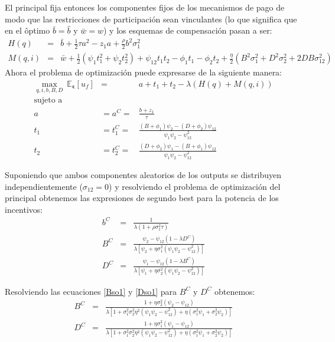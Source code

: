 ﻿\documentclass[12pt,letterpaper]{article}
\begin{document}
El principal fija entonces los componentes fijos de los mecanismos de pago de modo que las restricciones de participaci\'on sean vinculantes (lo que significa que en el \^optimo $ \bar{b}=\widehat{b} $ y $\bar{w}=\widehat{w} $) y los esquemas de compensaci\'on pasan a ser:
\begin{eqnarray*}
 H(q) &=& \bar{b}+\frac{1}{2}\tau a^2-z_1a+\frac{\rho}{2}b^2\sigma_1^2\\
  M(q,i) &=& \bar{w}+\frac{1}{2}(\psi_1t_1^2+\psi_2t_2^2)+\psi_{12}t_1t_2-\phi_1t_1-\phi_2t_2+\frac{\eta}{2}(B^2\sigma_1^2+D^2\sigma_2^2+2DB\sigma_{12}^2)
\end{eqnarray*}
Ahora el problema de optimizaci\'on puede expresarse de la siguiente manera:
\begin{eqnarray*}
\max\limits_{q,i,b,B,D}\ \mathbb{E}_{\mathbold{\epsilon}}[u_f]&=&a+t_1+t_2-\lambda(H(q)+M(q,i))\\
\nonumber \text{sujeto a }&&\\
a&=a^{C}=&\frac{b+z_1}{\tau}\\
t_1&=t_1^{C}=&\frac{(B+\phi_1)\psi_2-(D+\phi_2)\psi_{12}}{\psi_1\psi_2-\psi_{12}^2}\\
t_2&=t_2^{C}=&\frac { \left( D+\phi_{{2}} \right) \psi_{{1}}- \left( B+\phi _{{1}} \right)\psi_{{12}}}{\psi_1\psi_2-\psi_{12}^2}
\end{eqnarray*}

Suponiendo que ambos componentes aleatorios de los outputs se distribuyen independientemente ($\sigma_{12}=0$) y resolviendo el problema de optimizaci\'on del principal obtenemos las expresiones de segundo best para la potencia de los incentivos:
\begin{eqnarray}
b^C&=&\frac {1}{\lambda(1+\rho\sigma_1^2\tau)}\label{bso}\\
B^C&=&\frac{\psi_2-\psi_{12}(1-\lambda D^C)}{\lambda[\psi_2+\eta\sigma_1^2(\psi_1\psi_2-\psi_{12}^2)]}\label{Bso1}\\
D^C&=&\frac{\psi_1-\psi_{12}(1-\lambda B^C)}{\lambda[\psi_1+\eta\sigma_2^2(\psi_1\psi_2-\psi_{12}^2)]}\label{Dso1}
\end{eqnarray}

Resolviendo las ecuaciones \ref{Bso1} y \ref{Dso1} para $B^C$ y $D^C$ obtenemos:
\begin{eqnarray}
B^C&=&\frac{1+\eta\sigma_2^2(\psi_2-\psi_{12})}{\lambda[1+\sigma_1^2\sigma_2^2\eta^2(\psi_1\psi_2-\psi_{12}^2)+\eta(\sigma_1^2\psi_1+\sigma_2^2\psi_2)]}\label{Bso2}\\
D^C&=&\frac{1+\eta\sigma_1^2(\psi_1-\psi_{12})}{\lambda[1+\sigma_1^2\sigma_2^2\eta^2(\psi_1\psi_2-\psi_{12}^2)+\eta(\sigma_1^2\psi_1+\sigma_2^2\psi_2)]}\label{Dso2}
\end{eqnarray}
\end{document}
